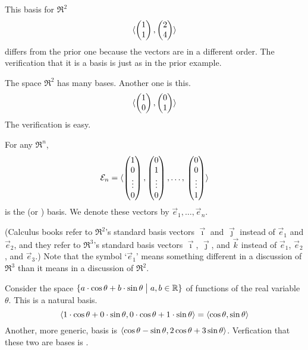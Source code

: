 \begin{example}
This basis for \( \Re^2 \) 
\begin{equation*}
  \langle\begin{pmatrix} 1 \\ 1 \end{pmatrix},\begin{pmatrix} 2 \\ 4 \end{pmatrix}\rangle
\end{equation*}
differs from the prior one because the vectors are in a different order.
The verification that it is a basis is just as in the prior example.
\end{example}

\begin{example}
The space \( \Re^2 \) has many bases.
Another one is this.
\begin{equation*}
  \langle \begin{pmatrix} 1 \\ 0 \end{pmatrix},\begin{pmatrix} 0 \\ 1 \end{pmatrix} \rangle
\end{equation*}
The verification is easy.
\end{example}

\begin{definition}
For any \( \Re^n \),
\begin{equation*}
   {\cal E}_n=\langle
     \begin{pmatrix} 1 \\ 0 \\ \vdots \\ 0 \end{pmatrix},
     \begin{pmatrix} 0 \\ 1 \\ \vdots \\ 0 \end{pmatrix},
     \dots,\,
     \begin{pmatrix} 0 \\ 0 \\ \vdots \\ 1 \end{pmatrix}\rangle
\end{equation*}
is the %
 (or ) basis.
We denote these vectors by \( \vec{e}_1,\dots,\vec{e}_n \).
\end{definition}

\noindent 
(Calculus books refer to $\Re^2$'s standard basis vectors
\( \vec{\imath} \) and \( \vec{\jmath} \) instead of $\vec{e}_1$
and $\vec{e}_2$, and they refer to 
\( \Re^3 \)'s standard basis vectors
\( \vec{\imath} \), \( \vec{\jmath} \), and \( \vec{k} \)
instead of $\vec{e}_1$, $\vec{e}_2$, and $\vec{e}_3$.)
Note that the symbol `\( \vec{e}_1 \)' means something different in a
discussion of \( \Re^3 \) than it means in a discussion of \( \Re^2 \).

\begin{example}  \label{ex:BasisForCosPlusSin}
Consider the space
\( \mbox{$\{a\cdot\cos\theta+b\cdot\sin\theta\bigm| a,b\in\mathbb{R}\}$} \)
of functions of the real variable $\theta$.
This is a natural basis. 
\begin{equation*}
 \langle1\cdot\cos\theta+0\cdot\sin\theta,
             0\cdot\cos\theta+1\cdot\sin\theta\rangle
   =\langle\cos\theta, \sin\theta\rangle 
\end{equation*}
Another, more generic, basis is
\( \langle\cos\theta-\sin\theta,
             2\cos\theta+3\sin\theta\rangle \).
Verfication that these two are bases is
.
\end{example}

